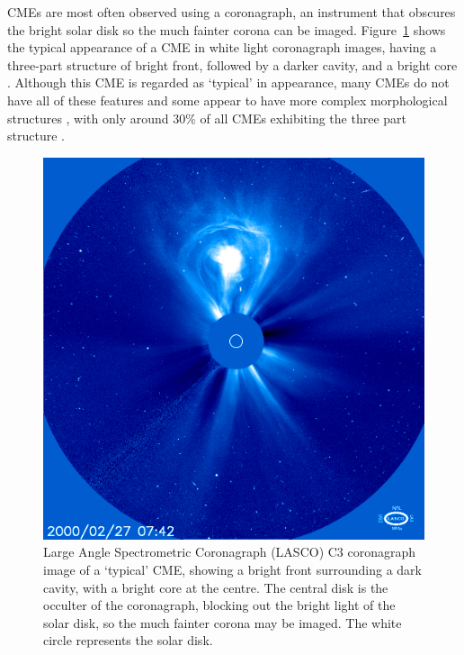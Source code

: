 CMEs are most often observed using a coronagraph, an instrument that obscures the bright solar disk so the much fainter corona can be imaged. Figure~\ref{fig:lasco_c3} shows the typical appearance of a CME in white light coronagraph images, having a three-part structure of bright front, followed by a darker cavity, and a bright core \citep{illing1985}. Although this CME is regarded as \textquoteleft typical' in appearance, many CMEs do not have all of these features and some appear to have more complex morphological structures \citep{pick2006}, with only around 30\% of all CMEs exhibiting the three part structure \citep{webbHu1987}. 
\begin{figure}[t!]
\begin{center}
\includegraphics[scale=0.45]{images/lasco_c3}
\caption[LASCO C3 image of a CME]{Large Angle Spectrometric Coronagraph (LASCO) C3 coronagraph image of a \textquoteleft typical' CME, showing  a bright front surrounding a dark cavity, with a bright core at the centre. The central disk is the occulter of the coronagraph, blocking out the bright light of the solar disk, so the much fainter corona may be imaged. The white circle represents the solar disk.}
\label{fig:lasco_c3}
\end{center}
\end{figure}

